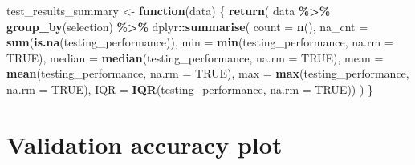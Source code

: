 \documentclass[
]{book}
\newenvironment{Shaded}{\begin{snugshade}}{\end{snugshade}}
\newcommand{\AttributeTok}[1]{\textcolor[rgb]{0.13,0.29,0.53}{#1}}
\newcommand{\ConstantTok}[1]{\textcolor[rgb]{0.56,0.35,0.01}{#1}}
\newcommand{\ControlFlowTok}[1]{\textcolor[rgb]{0.13,0.29,0.53}{\textbf{#1}}}
\newcommand{\FunctionTok}[1]{\textcolor[rgb]{0.13,0.29,0.53}{\textbf{#1}}}
\newcommand{\NormalTok}[1]{#1}
\newcommand{\OtherTok}[1]{\textcolor[rgb]{0.56,0.35,0.01}{#1}}
\newcommand{\SpecialCharTok}[1]{\textcolor[rgb]{0.81,0.36,0.00}{\textbf{#1}}}
\begin{document}
\begin{Shaded}
\begin{Highlighting}[]
\NormalTok{test\_results\_summary }\OtherTok{\textless{}{-}} \ControlFlowTok{function}\NormalTok{(data) \{}
    \FunctionTok{return}\NormalTok{(}
\NormalTok{        data }\SpecialCharTok{\%\textgreater{}\%}
        \FunctionTok{group\_by}\NormalTok{(selection) }\SpecialCharTok{\%\textgreater{}\%}
\NormalTok{        dplyr}\SpecialCharTok{::}\FunctionTok{summarise}\NormalTok{(}
            \AttributeTok{count =} \FunctionTok{n}\NormalTok{(),}
            \AttributeTok{na\_cnt =} \FunctionTok{sum}\NormalTok{(}\FunctionTok{is.na}\NormalTok{(testing\_performance)),}
            \AttributeTok{min =} \FunctionTok{min}\NormalTok{(testing\_performance, }\AttributeTok{na.rm =} \ConstantTok{TRUE}\NormalTok{),}
            \AttributeTok{median =} \FunctionTok{median}\NormalTok{(testing\_performance, }\AttributeTok{na.rm =} \ConstantTok{TRUE}\NormalTok{),}
            \AttributeTok{mean =} \FunctionTok{mean}\NormalTok{(testing\_performance, }\AttributeTok{na.rm =} \ConstantTok{TRUE}\NormalTok{),}
            \AttributeTok{max =} \FunctionTok{max}\NormalTok{(testing\_performance, }\AttributeTok{na.rm =} \ConstantTok{TRUE}\NormalTok{),}
            \AttributeTok{IQR =} \FunctionTok{IQR}\NormalTok{(testing\_performance, }\AttributeTok{na.rm =} \ConstantTok{TRUE}\NormalTok{))}
\NormalTok{    )}
\NormalTok{\}}
\end{Highlighting}
\end{Shaded}

\hypertarget{validation-accuracy-plot}{%
\section{Validation accuracy plot}\label{validation-accuracy-plot}}
\end{document}

